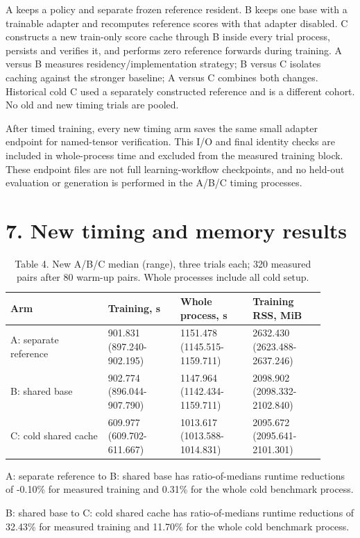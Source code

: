 \documentclass[10pt]{article}
\begin{document}
A keeps a policy and separate frozen reference resident. B keeps one base with a trainable adapter and recomputes reference scores with that adapter disabled. C constructs a new train-only score cache through B inside every trial process, persists and verifies it, and performs zero reference forwards during training. A versus B measures residency/implementation strategy; B versus C isolates caching against the stronger baseline; A versus C combines both changes. Historical cold C used a separately constructed reference and is a different cohort. No old and new timing trials are pooled.


After timed training, every new timing arm saves the same small adapter endpoint for named-tensor verification. This I/O and final identity checks are included in whole-process time and excluded from the measured training block. These endpoint files are not full learning-workflow checkpoints, and no held-out evaluation or generation is performed in the A/B/C timing processes.


\section*{7. New timing and memory results}

\begin{table}[htbp]\centering\footnotesize\caption{Table 4. New A/B/C median (range), three trials each; 320 measured pairs after 80 warm-up pairs. Whole processes include all cold setup.}
\begin{tabular}{p{0.279\linewidth}p{0.207\linewidth}p{0.207\linewidth}p{0.207\linewidth}}
\toprule
Arm & Training, s & Whole process, s & Training RSS, MiB \\ \midrule
A: separate reference & 901.831 (897.240-902.195) & 1151.478 (1145.515-1159.711) & 2632.430 (2623.488-2637.246) \\
B: shared base & 902.774 (896.044-907.790) & 1147.964 (1142.434-1159.711) & 2098.902 (2098.332-2102.840) \\
C: cold shared cache & 609.977 (609.702-611.667) & 1013.617 (1013.588-1014.831) & 2095.672 (2095.641-2101.301) \\
\bottomrule\end{tabular}\end{table}

A: separate reference to B: shared base has ratio-of-medians runtime reductions of -0.10\% for measured training and 0.31\% for the whole cold benchmark process.


B: shared base to C: cold shared cache has ratio-of-medians runtime reductions of 32.43\% for measured training and 11.70\% for the whole cold benchmark process.
\end{document}
